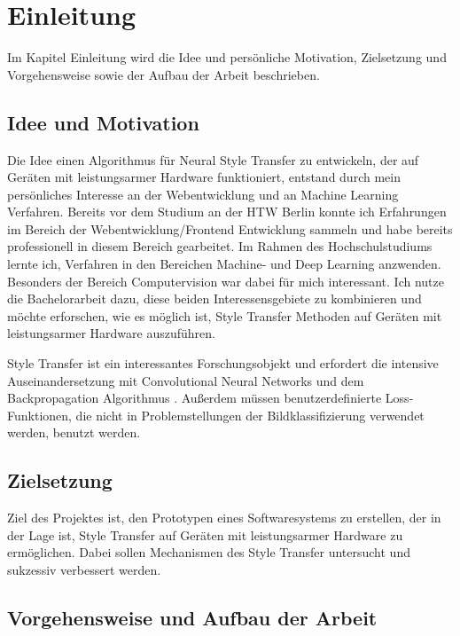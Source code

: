 \chapter{Einleitung}

Im Kapitel Einleitung wird die Idee und persönliche Motivation, Zielsetzung und Vorgehensweise sowie der Aufbau der Arbeit beschrieben.

\section{Idee und Motivation}

Die Idee einen Algorithmus für Neural Style Transfer zu entwickeln, der auf Geräten mit leistungsarmer Hardware funktioniert, entstand durch mein persönliches Interesse an der Webentwicklung und an Machine Learning Verfahren. Bereits vor dem Studium an der HTW Berlin konnte ich Erfahrungen im Bereich der Webentwicklung/Frontend Entwicklung sammeln und habe bereits professionell in diesem Bereich gearbeitet. Im Rahmen des Hochschulstudiums lernte ich, Verfahren in den Bereichen Machine- und Deep Learning anzwenden. Besonders der Bereich Computervision war dabei für mich interessant. Ich nutze die Bachelorarbeit dazu, diese beiden Interessensgebiete zu kombinieren und möchte erforschen, wie es möglich ist, Style Transfer Methoden auf Geräten mit leistungsarmer Hardware auszuführen.

Style Transfer ist ein interessantes Forschungsobjekt und erfordert die intensive Auseinandersetzung mit Convolutional Neural Networks \cite{lecun-gradientbased-learning-applied-1998} und dem Backpropagation Algorithmus \cite{doi:10.1162/neco.1989.1.4.541}. Außerdem müssen benutzerdefinierte Loss-Funktionen, die nicht in Problemstellungen der Bildklassifizierung verwendet werden, benutzt werden.

\section{Zielsetzung}

Ziel des Projektes ist, den Prototypen eines Softwaresystems zu erstellen, der in der Lage ist, Style Transfer auf Geräten mit leistungsarmer Hardware zu ermöglichen. Dabei sollen Mechanismen des Style Transfer untersucht und sukzessiv verbessert werden.

\section{Vorgehensweise und Aufbau der Arbeit}

